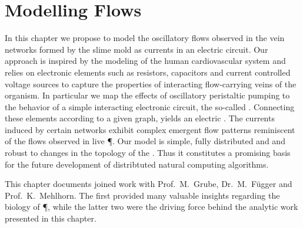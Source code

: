 \chapter{Modelling Flows}\label{chap:model}

	In this chapter we propose to model the oscillatory flows observed in the vein networks formed by the slime mold \Pp as currents in an electric circuit. Our approach is inspired by the modeling of the human cardiovascular system and relies on electronic elements such as resistors, capacitors and current controlled voltage sources to capture the properties of interacting flow-carrying veins of the organism. In particular we map the effects of oscillatory peristaltic pumping to the behavior of a simple interacting electronic circuit, the so-called \Pe. Connecting these elements according to a given graph, yields an electric \Pn. The currents induced by certain networks exhibit complex emergent flow patterns reminiscent of the flows observed in live \P. Our model is simple, fully distributed and and robust to changes in the topology of the \Pn. Thus it constitutes a promising basis for the future development of distribtuted natural computing algorithms.

	This chapter documents joined work with Prof.~M.~Grube, Dr.~M.~F\"ugger and Prof.~K.~Mehlhorn. The first provided many valuable insights regarding the biology of \P, while the latter two were the driving force behind the analytic work presented in this chapter.

	
	
	
	
	
	

